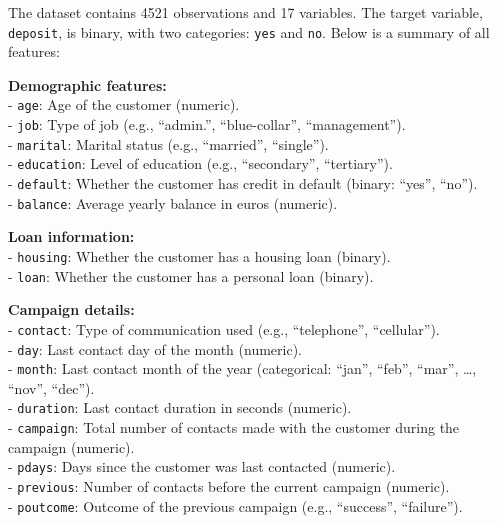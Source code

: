 \documentclass[
  11pt,
]{book}
\makeatletter
\newenvironment{Shaded}{}{}
\newcommand{\DecValTok}[1]{#1}
\newcommand{\NormalTok}[1]{#1}
\newcommand{\SpecialCharTok}[1]{\textcolor[rgb]{0.39,0.39,0.39}{#1}}
\newcommand{\StringTok}[1]{\textcolor[rgb]{0.39,0.39,0.39}{#1}}
\newenvironment{kframe}{%
\medskip{}
\setlength{\fboxsep}{.8em}
 \def\at@end@of@kframe{}%
 \ifinner\ifhmode%
  \def\at@end@of@kframe{\end{minipage}}%
  \begin{minipage}{\columnwidth}%
 \fi\fi%
 \def\FrameCommand##1{\hskip\@totalleftmargin \hskip-\fboxsep
 \colorbox{shadecolor}{##1}\hskip-\fboxsep
     \hskip-\linewidth \hskip-\@totalleftmargin \hskip\columnwidth}%
 \MakeFramed {\advance\hsize-\width
   \@totalleftmargin\z@ \linewidth\hsize
   \@setminipage}}%
 {\par\unskip\endMakeFramed%
 \at@end@of@kframe}
\renewenvironment{Shaded}{\begin{kframe}}{\end{kframe}}
\theoremstyle{definition}
\theoremstyle{definition}
\theoremstyle{definition}
\theoremstyle{definition}
\theoremstyle{remark}
\makeatother
\begin{document}
\begin{Shaded}
\end{Shaded}

The dataset contains 4521 observations and 17 variables. The target variable, \texttt{deposit}, is binary, with two categories: \texttt{yes} and \texttt{no}. Below is a summary of all features:

\textbf{Demographic features:}\\
- \texttt{age}: Age of the customer (numeric).\\
- \texttt{job}: Type of job (e.g., ``admin.'', ``blue-collar'', ``management'').\\
- \texttt{marital}: Marital status (e.g., ``married'', ``single'').\\
- \texttt{education}: Level of education (e.g., ``secondary'', ``tertiary'').\\
- \texttt{default}: Whether the customer has credit in default (binary: ``yes'', ``no'').\\
- \texttt{balance}: Average yearly balance in euros (numeric).

\textbf{Loan information:}\\
- \texttt{housing}: Whether the customer has a housing loan (binary).\\
- \texttt{loan}: Whether the customer has a personal loan (binary).

\textbf{Campaign details:}\\
- \texttt{contact}: Type of communication used (e.g., ``telephone'', ``cellular'').\\
- \texttt{day}: Last contact day of the month (numeric).\\
- \texttt{month}: Last contact month of the year (categorical: ``jan'', ``feb'', ``mar'', \ldots, ``nov'', ``dec'').\\
- \texttt{duration}: Last contact duration in seconds (numeric).\\
- \texttt{campaign}: Total number of contacts made with the customer during the campaign (numeric).\\
- \texttt{pdays}: Days since the customer was last contacted (numeric).\\
- \texttt{previous}: Number of contacts before the current campaign (numeric).\\
- \texttt{poutcome}: Outcome of the previous campaign (e.g., ``success'', ``failure'').
\end{document}
